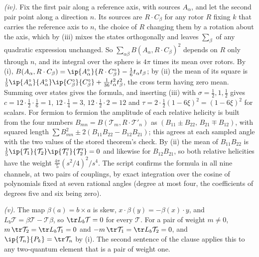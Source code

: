\emph{(iv).} Fix the first pair along a reference axis, with sources $A_{\alpha}$, and let the second pair point along a direction $n$. Its sources are $R \cdot C_{\beta}$ for any rotor $R$ fixing $k$ that carries the reference axis to $n$, the choice of $R$ changing them by a rotation about the axis, which by (iii) mixes the states orthogonally and leaves $\sum_{\beta}$ of any quadratic expression unchanged. So $\sum_{\alpha\beta} B(A_{\alpha}, R \cdot C_{\beta})^{2}$ depends on $R$ only through $n$, and its integral over the sphere is $4\pi$ times its mean over rotors. By (i), $B(A_{\alpha}, R \cdot C_{\beta}) = \ip{A_{\alpha}^{\circ}}{R \cdot C_{\beta}^{\circ}} - \tfrac16 t_{\alpha}t_{\beta}$; by (ii) the mean of its square is $\tfrac15\ip{A_{\alpha}^{\circ}}{A_{\alpha}^{\circ}}\ip{C_{\beta}^{\circ}}{C_{\beta}^{\circ}} + \tfrac{1}{36}t_{\alpha}^{2}t_{\beta}^{2}$, the cross term having zero mean. Summing over states gives the formula, and inserting (iii) with $\sigma = \tfrac12, 1, \tfrac12$ gives $c = 12 \cdot \tfrac12 \cdot \tfrac16 = 1$, $12 \cdot \tfrac14 = 3$, $12 \cdot \tfrac12 \cdot 2 = 12$ and $\tau = 2 \cdot \tfrac12 (1 - 6\xi)^{2} = (1 - 6\xi)^{2}$ for scalars. For fermion to fermion the amplitude of each relative helicity is built from the four numbers $B_{mn} = B(\mathcal{T}_{m}, R \cdot \mathcal{T}'_{n})$ as $(B_{11} \pm B_{22},\, B_{21} \mp B_{12})$, with squared length $\sum B_{mn}^{2} \pm 2(B_{11}B_{22} - B_{12}B_{21})$; this agrees at each sampled angle with the two values of the stored theorem's check. By (ii) the mean of $B_{11}B_{22}$ is $\tfrac15\ip{\mathcal{T}_{1}}{\mathcal{T}_{2}}\ip{\mathcal{T}'_{1}}{\mathcal{T}'_{2}} = 0$ and likewise for $B_{12}B_{21}$, so both relative helicities have the weight $\tfrac{4\pi}{5}(s^{2}/4)^{2}/s^{4}$. The script confirms the formula in all nine channels, at two pairs of couplings, by exact integration over the cosine of polynomials fixed at seven rational angles (degree at most four, the coefficients of degrees five and six being zero).

\emph{(v).} The map $\beta(a) = b \times a$ is skew, $x \cdot \beta(y) = -\beta(x) \cdot y$, and $L_{b}\mathcal{T} = \beta\mathcal{T} - \mathcal{T}\beta$, so $\tr L_{b}\mathcal{T} = 0$ for every $\mathcal{T}$. For a pair of weight $m \neq 0$, $m\,\tr\mathcal{T}_{2} = \tr L_{b}\mathcal{T}_{1} = 0$ and $-m\,\tr\mathcal{T}_{1} = \tr L_{b}\mathcal{T}_{2} = 0$, and $\ip{\mathcal{T}_{n}}{P_{k}} = \tr\mathcal{T}_{n}$ by (i). The second sentence of the clause applies this to any two-quantum element that is a pair of weight one.

